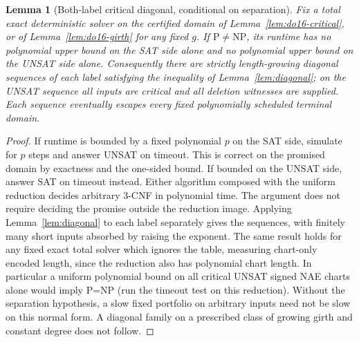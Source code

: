\documentclass[11pt]{article}
\newtheorem{lemma}[theorem]{Lemma}
\begin{document}
\begin{lemma}[Both-label critical diagonal, conditional on separation]\label{lem:do16-diag}
Fix a total exact deterministic solver on the certified domain of Lemma~\ref{lem:do16-critical}, or of Lemma~\ref{lem:do16-girth} for any fixed $g$. If $\mathrm P\ne\mathrm{NP}$, its runtime has no polynomial upper bound on the SAT side alone and no polynomial upper bound on the UNSAT side alone. Consequently there are strictly length-growing diagonal sequences of each label satisfying the inequality of Lemma~\ref{lem:diagonal}; on the UNSAT sequence all inputs are critical and all deletion witnesses are supplied. Each sequence eventually escapes every fixed polynomially scheduled terminal domain.
\end{lemma}
\begin{proof}
If runtime is bounded by a fixed polynomial $p$ on the SAT side, simulate for $p$ steps and answer UNSAT on timeout. This is correct on the promised domain by exactness and the one-sided bound. If bounded on the UNSAT side, answer SAT on timeout instead. Either algorithm composed with the uniform reduction decides arbitrary 3-CNF in polynomial time. The argument does not require deciding the promise outside the reduction image. Applying Lemma~\ref{lem:diagonal} to each label separately gives the sequences, with finitely many short inputs absorbed by raising the exponent. The same result holds for any fixed exact total solver which ignores the table, measuring chart-only encoded length, since the reduction also has polynomial chart length. In particular a uniform polynomial bound on all critical UNSAT signed NAE charts alone would imply P=NP (run the timeout test on this reduction). Without the separation hypothesis, a slow fixed portfolio on arbitrary inputs need not be slow on this normal form. A diagonal family on a prescribed class of growing girth and constant degree does not follow.
\end{proof}
\end{document}
